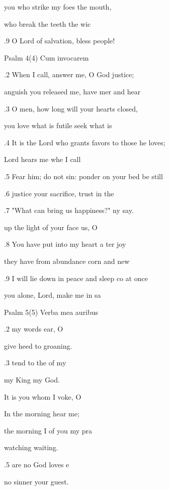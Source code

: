 you who strike my foes  the mouth, 

 who break the teeth  the wic 

.9 O Lord of salvation, bless  people! 

Psalm 4(4) Cum invocarem 


.2 When I call, answer me, O God  justice; 

 anguish you released me, have mer and hear  

.3 O men, how long will your hearts  closed, 

 you love what is futile  seek what is  

.4 It is the Lord who grants favors to those  he loves; 

 Lord hears me whe I call  

.5 Fear him; do not sin: ponder on your bed  be still 

.6  justice your sacrifice,  trust in the  

.7 "What can bring us happiness?" ny say. 

 up the light of your face  us, O  

.8 You have put into my heart a ter joy 

 they have from abundance  corn and new  

.9 I will lie down in peace and sleep co at once 

 you alone, Lord, make me  in sa 

Psalm 5(5) Verba mea auribus 


.2  my words  ear, O  

give heed to  groaning. 

.3 tend to the  of my  

my King  my God. 

 It is you whom I voke, O  

In the morning  hear me; 

 the morning I of you my pra 

watching  waiting. 

.5  are no God  loves e 

no sinner  your guest. 

